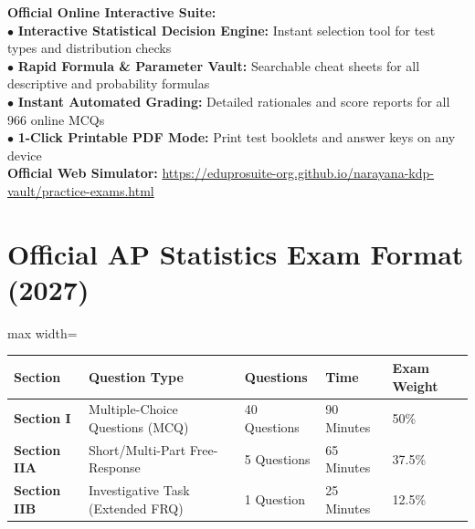 \begin{center}
\begin{tcolorbox}[standard jigsaw,width=0.95\linewidth,colback=NavyBlue!5!white,colframe=NavyBlue,title=\textbf{FREE DIGITAL WEB COMPANION \& PRACTICE PORTAL}]
\begin{minipage}{0.95\linewidth}
  \textbf{Official Online Interactive Suite:}\\
  $\bullet$ \textbf{Interactive Statistical Decision Engine:} Instant selection tool for test types and distribution checks\\
  $\bullet$ \textbf{Rapid Formula \& Parameter Vault:} Searchable cheat sheets for all descriptive and probability formulas\\
  $\bullet$ \textbf{Instant Automated Grading:} Detailed rationales and score reports for all 966 online MCQs\\
  $\bullet$ \textbf{1-Click Printable PDF Mode:} Print test booklets and answer keys on any device\\[6pt]
  \textbf{Official Web Simulator:} \url{https://eduprosuite-org.github.io/narayana-kdp-vault/practice-exams.html}
\end{minipage}
\end{tcolorbox}
\end{center}

\section*{Official AP Statistics Exam Format (2027)}
\begin{adjustbox}{max width=\linewidth}
\begin{tabular}{lllll}
\toprule
\textbf{Section} & \textbf{Question Type} & \textbf{Questions} & \textbf{Time} & \textbf{Exam Weight} \\
\midrule
\textbf{Section I} & Multiple-Choice Questions (MCQ) & 40 Questions & 90 Minutes & 50\% \\
\textbf{Section IIA} & Short/Multi-Part Free-Response & 5 Questions & 65 Minutes & 37.5\% \\
\textbf{Section IIB} & Investigative Task (Extended FRQ) & 1 Question & 25 Minutes & 12.5\% \\
\bottomrule
\end{tabular}
\end{adjustbox}

